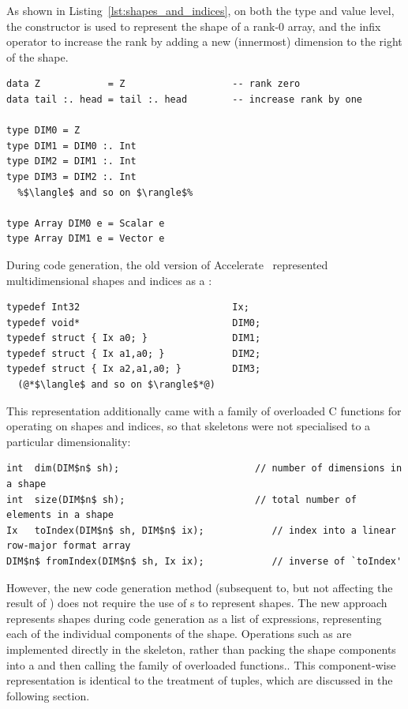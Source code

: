 As shown in Listing~\ref{lst:shapes_and_indices}, on both the type and value
level, the constructor  is used to represent the shape of a rank-0
array, and the infix operator  to increase the rank by adding a new
(innermost) dimension to the right of the shape.

\begin{lstlisting}[style=haskell
    ,float
    ,label=lst:shapes_and_indices
    ,caption={Types of array shapes and indices}]
data Z            = Z                   -- rank zero
data tail :. head = tail :. head        -- increase rank by one

type DIM0 = Z
type DIM1 = DIM0 :. Int
type DIM2 = DIM1 :. Int
type DIM3 = DIM2 :. Int
  %$\langle$ and so on $\rangle$%

type Array DIM0 e = Scalar e
type Array DIM1 e = Vector e
\end{lstlisting}

During code generation, the old version of Accelerate~\cite{Chakravarty:2011fr}
represented multidimensional shapes and indices as a :
%
\begin{lstlisting}[style=cuda]
typedef Int32                           Ix;
typedef void*                           DIM0;
typedef struct { Ix a0; }               DIM1;
typedef struct { Ix a1,a0; }            DIM2;
typedef struct { Ix a2,a1,a0; }         DIM3;
  (@*$\langle$ and so on $\rangle$*@)
\end{lstlisting}
%
This representation additionally came with a family of overloaded C functions
for operating on shapes and indices, so that skeletons were not specialised to a
particular dimensionality:
%
\begin{lstlisting}[style=cuda,mathescape]
int  dim(DIM$n$ sh);                        // number of dimensions in a shape
int  size(DIM$n$ sh);                       // total number of elements in a shape
Ix   toIndex(DIM$n$ sh, DIM$n$ ix);            // index into a linear row-major format array
DIM$n$ fromIndex(DIM$n$ sh, Ix ix);            // inverse of `toIndex'
\end{lstlisting}

However, the new code generation method (subsequent to, but not affecting the
result of \cite{CliftonEverest:2014vi}) does not require the use of
s to represent shapes. The new approach represents shapes during
code generation as a list of expressions, representing each of the individual
components of the shape. Operations such as  are implemented
directly in the skeleton, rather than packing the shape components into a
 and then calling the family of overloaded functions.. This
component-wise representation is identical to the treatment of tuples, which are
discussed in the following section.


